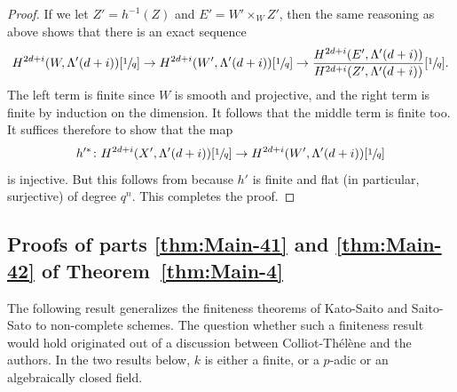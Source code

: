 \documentclass[JEP,XML,SOM,Unicode,published]{cedram}
\let\ra\rightarrow
\theoremstyle{definition}
\newcommand{\thmref}{Theorem~\ref}
\begin{document}
\begin{proof}
If we let $Z' = h^{-1}(Z)$ and $E' = W' \times_W Z'$, then the same reasoning
as above shows that there is an exact sequence
\begin{align*}
H^{2d+i}(W, \Lambda'(d+i))[\sfrac{1}{q}] \ra
H^{2d+i}(W', \Lambda'(d+i))[\sfrac{1}{q}] \ra
\frac{H^{2d+i}(E', \Lambda'(d+i))}{H^{2d+i}(Z', \Lambda'(d+i))}[\sfrac{1}{q}].
\end{align*}
The left term is finite since $W$ is smooth and projective, and the right term
is finite by induction on the dimension. It follows that the middle term is
finite too. It suffices therefore to show that the map
\[
h^{\prime \ast} \colon H^{2d+i}(X',\Lambda'(d+i))[\sfrac{1}{q}] \to
H^{2d+i}(W',\Lambda'(d+i))[\sfrac{1}{q}]
\]
is injective. But this follows from \cite[Prop.\,6.3]{Cisinski-Deglise}
because $h'$ is finite and flat (in particular, surjective) of degree $q^n$.
This completes the proof.
\end{proof}

\subsection{Proofs of parts \eqref{thm:Main-41} and \eqref{thm:Main-42} of \thmref{thm:Main-4}}
\label{sec:M4-pf-1}
The following result generalizes the finiteness theorems of
Kato-Saito \cite{Kato-Saito-1} and Saito-Sato
\cite{SaitoSatoAnnals} to non-complete schemes.
The question whether such a finiteness result would hold originated out of
a discussion between Colliot-Thélène and the authors.
In the two results below, $k$ is either a finite, or a $p$-adic or an algebraically
closed field.
\end{document}
